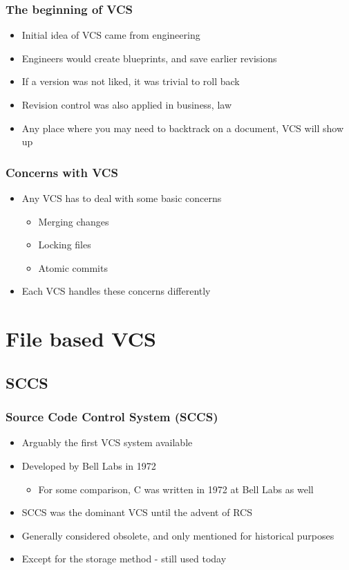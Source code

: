 \documentclass{beamer}
\begin{document}
\begin{frame}
    \frametitle{The beginning of VCS}
    \begin{itemize}
	\item Initial idea of VCS came from engineering
	\item Engineers would create blueprints, and save earlier revisions
	\item If a version was not liked, it was trivial to roll back
	\item Revision control was also applied in business, law
	\item Any place where you may need to backtrack on a document, VCS will show up
    \end{itemize}
\end{frame}

\begin{frame}
    \frametitle{Concerns with VCS}
    \begin{itemize}
	\item Any VCS has to deal with some basic concerns
	\begin{itemize}
	    \item Merging changes
	    \item Locking files
	    \item Atomic commits
	\end{itemize}
	\item Each VCS handles these concerns differently
    \end{itemize}
\end{frame}

\section{File based VCS}

\subsection{SCCS}

\begin{frame}
    \frametitle{Source Code Control System (SCCS)}
    \begin{itemize}
	\item Arguably the first VCS system available
	\item Developed by Bell Labs in 1972
	\begin{itemize}
	    \item For some comparison, C was written in 1972 at Bell Labs as well
	\end{itemize}
	\item SCCS was the dominant VCS until the advent of RCS 
	\item Generally considered obsolete, and only mentioned for historical purposes
	\item Except for the storage method - still used today
    \end{itemize}
\end{frame}
\end{document}
